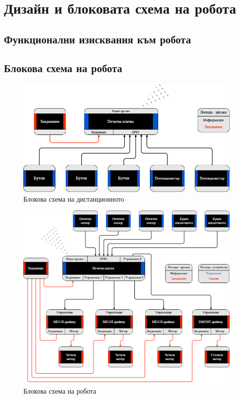 \chapter{Дизайн и блоковата схема на робота}

\section{Функционални изисквания към робота}
\label{sec:requirements}


\section{Блокова схема на робота}
\label{sec:block-schemas}

\begin{figure}[H]
    \centering
    \includegraphics[width=\linewidth]{images/block-schema-controller.png}
    
    \caption{Блокова схема на дистанционното}
    \label{fig:block-controller} 
\end{figure}

\begin{figure}[H]
    \centering
    \includegraphics[width=\linewidth]{images/block-schema-robot.png}
    
    \caption{Блокова схема на робота}
    \label{fig:block-robot} 
\end{figure}